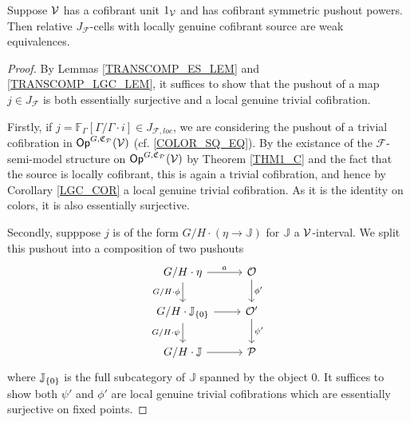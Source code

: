 \documentclass[a4paper,10pt
,draft
]{article}%
\renewcommand{\F}{\mathcal F}
\newcommand{\J}{\mathbb J}
\renewcommand{\1}{\eta}%
\begin{document}
\begin{proposition}
      \label{J-CELL_PROP}
      Suppose $\mathcal V$ has a cofibrant unit $1_{\mathcal V}$ and has cofibrant symmetric pushout powers.
      Then relative $J_{\F}$-cells with locally genuine cofibrant source are weak equivalences.
\end{proposition}
\begin{proof}
      By Lemmas \ref{TRANSCOMP_ES_LEM} and \ref{TRANSCOMP_LGC_LEM}, it suffices to show that
      the pushout of a map $j \in J_\F$ is both
      essentially surjective and a local genuine trivial cofibration.

      Firstly, if $j = \mathbb F_\Gamma[\Gamma/\Gamma \cdot i] \in J_{\F, loc}$, 
      we are considering the pushout of a trivial cofibration in $\mathsf{Op}^{G,\mathfrak C_{\mathcal{P}}}(\mathcal V)$ (cf. \eqref{COLOR_SQ_EQ}).
      By the existance of the $\F$-semi-model structure on $\mathsf{Op}^{G, \mathfrak C_{\mathcal{P}}}(\mathcal V)$ by Theorem \ref{THM1_C}
      and the fact that the source is locally cofibrant,
      this is again a trivial cofibration, and hence by Corollary \ref{LGC_COR} a local genuine trivial cofibration.
      As it is the identity on colors, it is also essentially surjective.
      
      Secondly, supppose $j$ is of the form $G/H \cdot (\1 \to \J)$ for $\J$ a $\mathcal V$-interval.
      We split this pushout into a composition of two pushouts
      \begin{equation}
            \begin{tikzcd}
                  G/H \cdot \1 \arrow[r, "a"] \arrow[d, "G/H \cdot \phi"']
                  &
                  \O \arrow[d,"\phi'"]
                  \\
                  G/H \cdot \J_{\set{0}} \arrow[r] \arrow[d, "G/H \cdot \psi"']
                  &
                  \O' \arrow[d,"\psi'"]
                  \\
                  G/H \cdot \J \arrow[r]
                  &
                  \P
            \end{tikzcd}
      \end{equation}
      where $\J_{\set{0}}$ is the full subcategory of $\J$ spanned by the object $0$.
      It suffices to show both $\psi'$ and $\phi'$ are local genuine trivial cofibrations which are essentially surjective on fixed points. 


\end{proof}
\end{document}
